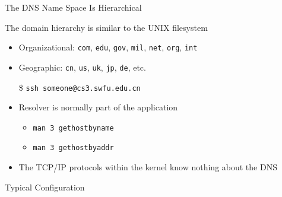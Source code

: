 \begin{frame}{The DNS Name Space Is Hierarchical}
  \begin{iblock}{The domain hierarchy is similar to the UNIX filesystem}
    \begin{center}
    \end{center}\label{fig:dns_tree}
  \end{iblock}
  \begin{itemize}
  \item Organizational: \texttt{com}, \texttt{edu}, \texttt{gov}, \texttt{mil}, \texttt{net},
    \texttt{org}, \texttt{int}
  \item Geographic: \texttt{cn}, \texttt{us}, \texttt{uk}, \texttt{jp}, \texttt{de}, etc.
  \end{itemize}
\end{frame}

\begin{frame}
  \begin{itemize}
  \item[\$] \texttt{ssh someone@cs3.swfu.edu.cn}
  \end{itemize}
  \begin{minipage}{.5\linewidth}
    \begin{iblock}{}
      \mode<beamer>{ \texttt{[image: resolver]} }%
    \end{iblock}
  \end{minipage}
  \begin{minipage}{.45\linewidth}
    \begin{itemize}
    \item Resolver is normally part of the application
      \begin{itemize}
      \item \texttt{man 3 gethostbyname}
      \item \texttt{man 3 gethostbyaddr}
      \end{itemize}
    \item The TCP/IP protocols within the kernel know nothing about the DNS
    \end{itemize}
  \end{minipage}
\end{frame}

\begin{frame}{Typical Configuration}
  \begin{center}
     
  \end{center}
\end{frame}


